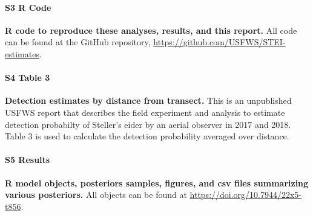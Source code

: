 \documentclass[
  10pt,
  letterpaper,
]{article}
\begin{document}
\paragraph*{S3 R Code}
\label{s3-code}
{\textbf{R code to reproduce these analyses, results, and this report.}
All code can be found at the GitHub repository,
\url{https://github.com/USFWS/STEI-estimates}.}

\paragraph*{S4 Table 3}
\label{s4-bradley}
{\textbf{Detection estimates by distance from transect.} This is an unpublished USFWS report that describes the field experiment and analysis to estimate detection probabilty of Steller's eider by an aerial observer in 2017 and 2018. Table 3 is used to calculate the detection probability averaged over distance.}

\paragraph*{S5 Results}
\label{s5-results}
{\textbf{R model objects, posteriors samples, figures, and csv files
summarizing various posteriors.} All objects can be found at
\url{https://doi.org/10.7944/22x5-t856}.}


\nolinenumbers
\end{document}
